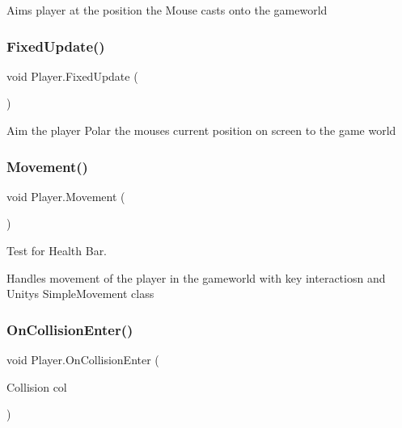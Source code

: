 Aims player at the position the Mouse casts onto the gameworld \mbox{\label{class_player_aa0458562e3da0655ecb39a0031114335}} 
\subsubsection{\texorpdfstring{Fixed\+Update()}{FixedUpdate()}}
{\footnotesize\ttfamily void Player.\+Fixed\+Update (\begin{DoxyParamCaption}{ }\end{DoxyParamCaption})\hspace{0.3cm}{\ttfamily [private]}}

Aim the player Polar the mouse\textquotesingle{}s current position on screen to the game world \mbox{\label{class_player_a8d9dc0cb892c8fdb15f25e41c7189ebd}} 
\subsubsection{\texorpdfstring{Movement()}{Movement()}}
{\footnotesize\ttfamily void Player.\+Movement (\begin{DoxyParamCaption}{ }\end{DoxyParamCaption})\hspace{0.3cm}{\ttfamily [private]}}



Test for Health Bar. 

Handles movement of the player in the gameworld with key interactiosn and Unitys Simple\+Movement class \mbox{\label{class_player_abd430d273ef011a22a6c63eee5067751}} 
\subsubsection{\texorpdfstring{On\+Collision\+Enter()}{OnCollisionEnter()}}
{\footnotesize\ttfamily void Player.\+On\+Collision\+Enter (\begin{DoxyParamCaption}\item[{Collision}]{col }\end{DoxyParamCaption})\hspace{0.3cm}{\ttfamily [private]}}


